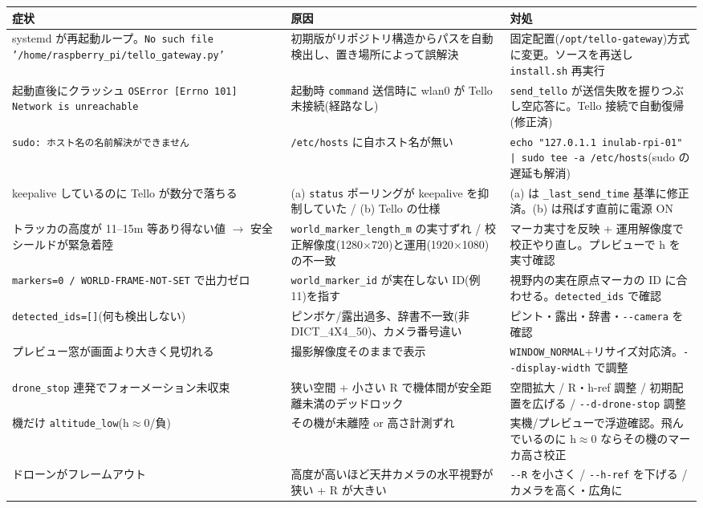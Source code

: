 \documentclass[11pt,a4paper]{ltjsarticle}
\newcommand{\code}[1]{\texttt{\small #1}}
\begin{document}
\begin{longtable}{@{}p{4.4cm}p{4.2cm}p{6.0cm}@{}}
\toprule
\textbf{症状} & \textbf{原因} & \textbf{対処} \\
\midrule
\endhead
systemd が再起動ループ。\code{No such file '/home/raspberry\_pi/tello\_gateway.py'} &
初期版がリポジトリ構造からパスを自動検出し、置き場所によって誤解決 &
固定配置(\code{/opt/tello-gateway})方式に変更。ソースを再送し \code{install.sh} 再実行 \\
\addlinespace
起動直後にクラッシュ \code{OSError [Errno 101] Network is unreachable} &
起動時 \code{command} 送信時に wlan0 が Tello 未接続(経路なし) &
\code{send\_tello} が送信失敗を握りつぶし空応答に。Tello 接続で自動復帰(修正済) \\
\addlinespace
\code{sudo: ホスト名の名前解決ができません} &
\code{/etc/hosts} に自ホスト名が無い &
\code{echo "127.0.1.1 inulab-rpi-01" | sudo tee -a /etc/hosts}(sudo の遅延も解消) \\
\addlinespace
keepalive しているのに Tello が数分で落ちる &
(a) \code{status} ポーリングが keepalive を抑制していた / (b) Tello の仕様 &
(a) は \code{\_last\_send\_time} 基準に修正済。(b) は飛ばす直前に電源 ON \\
\addlinespace
トラッカの高度が 11--15m 等あり得ない値 $\to$ 安全シールドが緊急着陸 &
\code{world\_marker\_length\_m} の実寸ずれ / 校正解像度(1280$\times$720)と運用(1920$\times$1080)の不一致 &
マーカ実寸を反映 + 運用解像度で校正やり直し。プレビューで h を実寸確認 \\
\addlinespace
\code{markers=0 / WORLD-FRAME-NOT-SET} で出力ゼロ &
\code{world\_marker\_id} が実在しない ID(例 11)を指す &
視野内の実在原点マーカの ID に合わせる。\code{detected\_ids} で確認 \\
\addlinespace
\code{detected\_ids=[]}(何も検出しない) &
ピンボケ/露出過多、辞書不一致(非 DICT\_4X4\_50)、カメラ番号違い &
ピント・露出・辞書・\code{-{}-camera} を確認 \\
\addlinespace
プレビュー窓が画面より大きく見切れる &
撮影解像度そのままで表示 &
\code{WINDOW\_NORMAL}+リサイズ対応済。\code{-{}-display-width} で調整 \\
\addlinespace
\code{drone\_stop} 連発でフォーメーション未収束 &
狭い空間 + 小さい R で機体間が安全距離未満のデッドロック &
空間拡大 / R・h-ref 調整 / 初期配置を広げる / \code{-{}-d-drone-stop} 調整 \\
\addlinespace
1 機だけ \code{altitude\_low}(h$\approx$0/負) &
その機が未離陸 or 高さ計測ずれ &
実機/プレビューで浮遊確認。飛んでいるのに h$\approx$0 ならその機のマーカ高さ校正 \\
\addlinespace
ドローンがフレームアウト &
高度が高いほど天井カメラの水平視野が狭い + R が大きい &
\code{-{}-R} を小さく / \code{-{}-h-ref} を下げる / カメラを高く・広角に \\
\bottomrule
\end{longtable}
\end{document}
